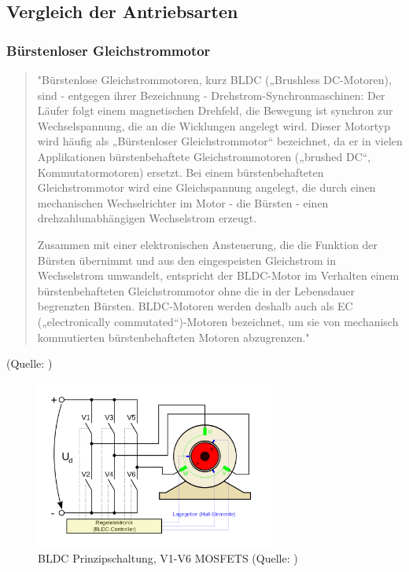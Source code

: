 \renewcommand{\autoren}{Severin Schendel	}
\subsection{Vergleich der Antriebsarten}
\subsubsection{Bürstenloser Gleichstrommotor}

\begin{quote}
"Bürstenlose Gleichstrommotoren, kurz BLDC („Brushless DC-Motoren), sind -  entgegen ihrer Bezeichnung - Drehstrom-Synchronmaschinen: Der Läufer folgt einem magnetischen Drehfeld, die Bewegung ist synchron zur Wechselspannung, die an die Wicklungen angelegt wird. Dieser Motortyp wird häufig als „Bürstenloser Gleichstrommotor“ bezeichnet, da er in vielen Applikationen bürstenbehaftete Gleichstrommotoren („brushed DC“, Kommutatormotoren) ersetzt. Bei einem bürstenbehafteten Gleichstrommotor wird eine Gleichspannung angelegt, die durch einen mechanischen Wechselrichter im Motor - die Bürsten - einen drehzahlunabhängigen Wechselstrom erzeugt.

Zusammen mit einer elektronischen Ansteuerung, die die Funktion der Bürsten übernimmt und aus den eingespeisten Gleichstrom in Wechselstrom umwandelt, entspricht der BLDC-Motor im Verhalten einem bürstenbehafteten Gleichstrommotor ohne die in der Lebensdauer begrenzten Bürsten.  BLDC-Motoren werden deshalb auch als EC („electronically commutated“)-Motoren bezeichnet, um sie von mechanisch kommutierten bürstenbehafteten Motoren abzugrenzen."
\end{quote}
(Quelle: \cite{BLDCNanotec})
\begin{figure}[h]  %
\centering\includegraphics[width=0.7\textwidth]{images/BLDC_Prinzipschaltung}
\caption{BLDC Prinzipschaltung, V1-V6 MOSFETS \newline (Quelle: \cite{PrinzipBLDC})}
\label{PrinzipBLDC}
\end{figure}
\newpage
